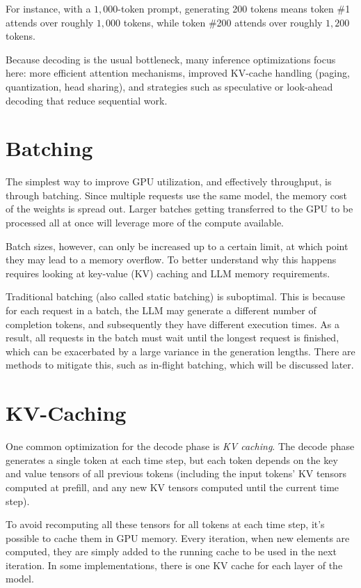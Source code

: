 For instance, with a $1{,}000$-token prompt, generating 200 tokens means token \#1 attends over roughly $1{,}000$ tokens, while token \#200 attends over roughly $1{,}200$ tokens.

Because decoding is the usual bottleneck, many inference optimizations focus here: more efficient attention mechanisms, improved KV-cache handling (\eg paging, quantization, head sharing), and strategies such as speculative or look-ahead decoding that reduce sequential work.

\section{Batching}

The simplest way to improve GPU utilization, and effectively throughput, is through batching. Since multiple requests use the same model, the memory cost of the weights is spread out. Larger batches getting transferred to the GPU to be processed all at once will leverage more of the compute available. 

Batch sizes, however, can only be increased up to a certain limit, at which point they may lead to a memory overflow. To better understand why this happens requires looking at key-value (KV) caching and LLM memory requirements.

Traditional batching (also called static batching) is suboptimal. This is because for each request in a batch, the LLM may generate a different number of completion tokens, and subsequently they have different execution times. As a result, all requests in the batch must wait until the longest request is finished, which can be exacerbated by a large variance in the generation lengths. There are methods to mitigate this, such as in-flight batching, which will be discussed later.

\section{KV-Caching}

One common optimization for the decode phase is \textit{KV caching}. The decode phase generates a single token at each time step, but each token depends on the key and value tensors of all previous tokens (including the input tokens' KV tensors computed at prefill, and any new KV tensors computed until the current time step). 

To avoid recomputing all these tensors for all tokens at each time step, it's possible to cache them in GPU memory. Every iteration, when new elements are computed, they are simply added to the running cache to be used in the next iteration. In some implementations, there is one KV cache for each layer of the model.

